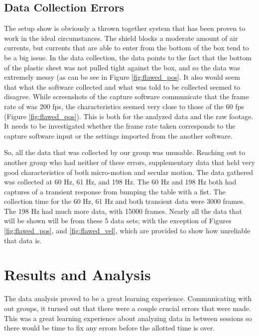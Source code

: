 \documentclass[12pt]{article}
\begin{document}
\subsection{Data Collection Errors}
The setup show is obviously a thrown together system that has been proven to work in the ideal circumstances. The shield blocks a moderate amount of air currents, but currents that are able to enter from the bottom of the box tend to be a big issue. In the data collection, the data points to the fact that the bottom of the plastic sheet was not pulled tight against the box, and so the data was extremely messy (as can be see in Figure \ref{fig:flawed_pos}. It also would seem that what the software collected and what was told to be collected seemed to disagree. While screenshots of the capture software communicate that the frame rate of was 200 fps, the characteristics seemed very close to those of the 60 fps (Figure \ref{fig:flawed_pos}). This is both for the analyzed data and the raw footage. It needs to be investigated whether the frame rate taken corresponds to the capture software input or the settings imported from the another software.

So, all the data that was collected by our group was unusable. Reaching out to another group who had neither of these errors, supplementary data that held very good characteristics of both micro-motion and secular motion. The data gathered was collected at 60 Hz, 61 Hz, and 198 Hz. The 60 Hz and 198 Hz both had captures of a transient response from bumping the table with a fist. The collection time for the 60 Hz, 61 Hz and both transient data were 3000 frames. The 198 Hz had much more data, with 15000 frames. Nearly all the data that will be shown will be from these 5 data sets; with the exception of Figures \ref{fig:flawed_pos}, and \ref{fig:flawed_vel}, which are provided to show how unreliable that data is. 


\section{Results and Analysis}
The data analysis proved to be a great learning experience. Communicating with out groups, it turned out that there were a couple crucial errors that were made. This was a great learning experience about analyzing data in between sessions so there would be time to fix any errors before the allotted time is over. 
\end{document}
